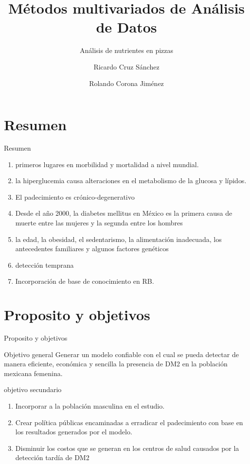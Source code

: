 \documentclass[pdf]{beamer}
\title{Métodos multivariados de Análisis de Datos}
\subtitle{Análisis de nutrientes en pizzas}
\author{
Ricardo Cruz Sánchez \\
  \and
Rolando Corona Jiménez
}
\institute[CIMAT]{CIMAT}
\begin{document}
\begin{frame}
\titlepage
\end{frame}


\section{Resumen}

\begin{frame}{Resumen}
\begin{enumerate}
\item primeros lugares en morbilidad y mortalidad a nivel mundial.
\item la hiperglucemia causa alteraciones en el metabolismo de la glucosa y l\'ipidos.
\item El padecimiento es cr\'onico-degenerativo
\item Desde el a\~no 2000, la diabetes mellitus en M\'exico es la primera causa de muerte entre las mujeres y la segunda entre los hombres
\item la edad, la obesidad, el sedentarismo, la alimentación inadecuada, los antecedentes familiares y algunos factores gen\'eticos
\item detección temprana
\item Incorporación de base de conocimiento en RB.
\end{enumerate}
\end{frame}


\section{Proposito y objetivos}
\begin{frame}{Proposito y objetivos}
\begin{block}{Objetivo general}
Generar un modelo confiable con el cual se pueda detectar de manera eficiente, econ\'omica y sencilla la presencia de DM2 en la población mexicana femenina.
\end{block}

\begin{block}{objetivo secundario}
\begin{enumerate}
	\item Incorporar a la poblaci\'on masculina en el estudio.
	\item Crear política públicas encaminadas a erradicar el padecimiento con base en los resultados generados por el modelo.
	\item Disminuir los costos que se generan en los centros de salud causados por la detecci\'on tard\'ia de DM2
\end{enumerate}
\end{block}
\end{frame}
\end{document}
